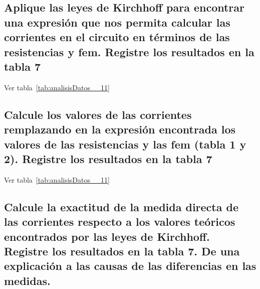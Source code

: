 \documentclass[twocolumn, 12pt]{article}
\begin{document}
\subsection{Aplique las leyes de Kirchhoff para encontrar una expresión que nos permita calcular las
    corrientes en el circuito en términos de las resistencias y fem. Registre los resultados en
    la tabla 7}

Ver tabla~\ref{tab:analisisDatos__11}

\subsection{Calcule los valores de las corrientes remplazando en la expresión encontrada los valores
    de las resistencias y las fem (tabla 1 y 2). Registre los resultados en la tabla 7}

Ver tabla~\ref{tab:analisisDatos__11}

\subsection{Calcule la exactitud de la medida directa de las corrientes respecto a los valores teóricos
    encontrados por las leyes de Kirchhoff. Registre los resultados en la tabla 7. De una
    explicación a las causas de las diferencias en las medidas.}
\end{document}
